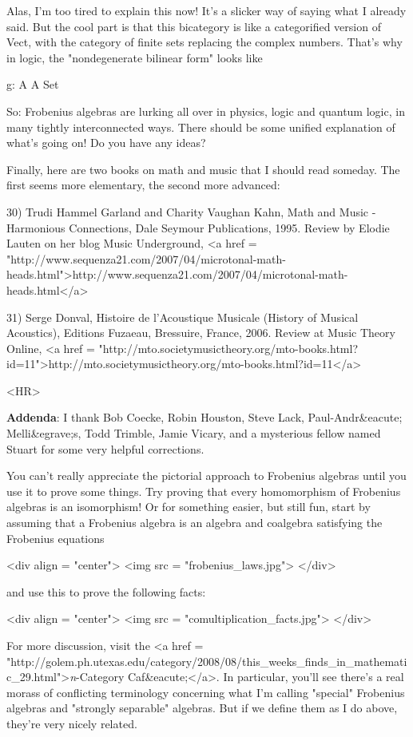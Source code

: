 Alas, I'm too tired to explain this now!  It's a slicker way of saying
what I already said.  But the cool part is that this bicategory is
like a categorified version of Vect, with the category of finite sets
replacing the complex numbers.  That's why in logic, the
"nondegenerate bilinear form" looks like

g: A \times  A \to  Set

So: Frobenius algebras are lurking all over in physics, logic
and quantum logic, in many tightly interconnected ways.  There 
should be some unified explanation of what's going on!  Do you have 
any ideas?

Finally, here are two books on math and music that I should read
someday.  The first seems more elementary, the second more advanced:

30) Trudi Hammel Garland and Charity Vaughan Kahn, Math and Music -
Harmonious Connections, Dale Seymour Publications, 1995.  Review 
by Elodie Lauten on her blog Music Underground, 
<a href = "http://www.sequenza21.com/2007/04/microtonal-math-heads.html">http://www.sequenza21.com/2007/04/microtonal-math-heads.html</a>

31) Serge Donval, Histoire de l'Acoustique Musicale (History of 
Musical Acoustics), Editions Fuzaeau, Bressuire, France, 2006.
Review at Music Theory Online, 
<a href = "http://mto.societymusictheory.org/mto-books.html?id=11">http://mto.societymusictheory.org/mto-books.html?id=11</a>

<HR>
 
\textbf{Addenda}: I thank Bob Coecke, Robin Houston, Steve Lack,
Paul-Andr&eacute; Melli&egrave;s,
Todd Trimble, Jamie Vicary, and a mysterious fellow named Stuart for
some very helpful corrections.

You can't really appreciate the pictorial approach to Frobenius
algebras until you use it to prove some things.  Try proving that 
every homomorphism of Frobenius algebras is an isomorphism!  Or
for something easier, but still fun, start by assuming
that a Frobenius algebra is an algebra and coalgebra satisfying
the Frobenius equations

<div align = "center">
<img src = "frobenius_laws.jpg">
</div>

and use this to prove the following facts:

<div align = "center">
<img src = "comultiplication_facts.jpg">
</div>

For more discussion, visit the 
<a href = "http://golem.ph.utexas.edu/category/2008/08/this_weeks_finds_in_mathematic_29.html">\emph{n}-Category 
Caf&eacute;</a>.  In particular, you'll see there's a real
morass of conflicting terminology concerning what I'm calling
"special" Frobenius algebras and "strongly 
separable" algebras.  But if we define them as I do above,
they're very nicely related.

